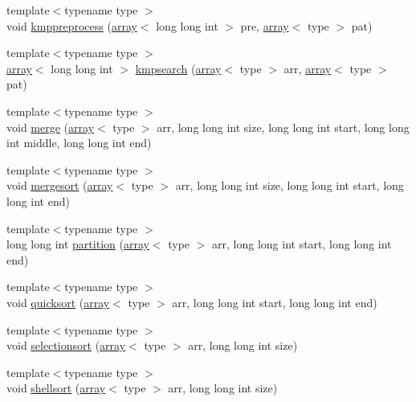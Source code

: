 \begin{DoxyCompactItemize}
\item 
{\footnotesize template$<$typename type $>$ }\\void \hyperlink{namespacedsa_aa3eb48ff01c3c42ae4a68ca9568c80db}{kmppreprocess} (\hyperlink{classdsa_1_1array}{array}$<$ long long int $>$ pre, \hyperlink{classdsa_1_1array}{array}$<$ type $>$ pat)
\item 
{\footnotesize template$<$typename type $>$ }\\\hyperlink{classdsa_1_1array}{array}$<$ long long int $>$ \hyperlink{namespacedsa_ac631850b97fd5d4f9e44bae038d1a4d1}{kmpsearch} (\hyperlink{classdsa_1_1array}{array}$<$ type $>$ arr, \hyperlink{classdsa_1_1array}{array}$<$ type $>$ pat)
\item 
{\footnotesize template$<$typename type $>$ }\\void \hyperlink{namespacedsa_a54cce1f2ebc3298f3b609e5d500511ec}{merge} (\hyperlink{classdsa_1_1array}{array}$<$ type $>$ arr, long long int size, long long int start, long long int middle, long long int end)
\item 
{\footnotesize template$<$typename type $>$ }\\void \hyperlink{namespacedsa_a053231304c8705306091282b2012fed5}{mergesort} (\hyperlink{classdsa_1_1array}{array}$<$ type $>$ arr, long long int size, long long int start, long long int end)
\item 
{\footnotesize template$<$typename type $>$ }\\long long int \hyperlink{namespacedsa_a93d3155d9f866fb7e5d43768e5d114ef}{partition} (\hyperlink{classdsa_1_1array}{array}$<$ type $>$ arr, long long int start, long long int end)
\item 
{\footnotesize template$<$typename type $>$ }\\void \hyperlink{namespacedsa_a0d142b52ca481166670c3f7d9946b6e5}{quicksort} (\hyperlink{classdsa_1_1array}{array}$<$ type $>$ arr, long long int start, long long int end)
\item 
{\footnotesize template$<$typename type $>$ }\\void \hyperlink{namespacedsa_ae14e88094014abbeef1509a14210683d}{selectionsort} (\hyperlink{classdsa_1_1array}{array}$<$ type $>$ arr, long long int size)
\item 
{\footnotesize template$<$typename type $>$ }\\void \hyperlink{namespacedsa_ac8246a9c7803dedba0a2531529ac2104}{shellsort} (\hyperlink{classdsa_1_1array}{array}$<$ type $>$ arr, long long int size)
\end{DoxyCompactItemize}


